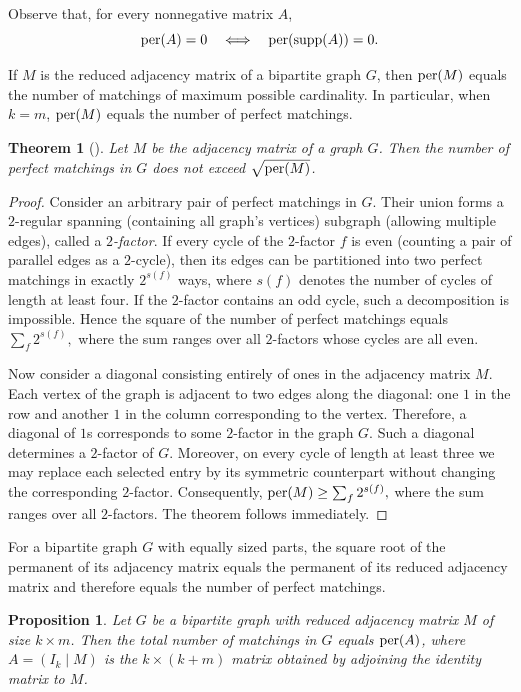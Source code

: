 \documentclass[11pt]{article}
\newtheorem{theorem}{Theorem}[section]
\newtheorem{claim}{Proposition}[section]
\theoremstyle{definition}
\newcommand{\supp}{{\rm supp}}
\newcommand{\per}{{\rm per}}
\begin{document}
{{{Observe that, for every nonnegative matrix $A$,
\[
\per(A)=0
\quad\Longleftrightarrow\quad
\per(\supp(A))=0.
\]

If $M$ is the reduced adjacency matrix of a bipartite graph $G$, then
$\per(M)$ equals the number of matchings of maximum possible
cardinality.
In particular, when $k=m$, $\per(M)$ equals the number of perfect
matchings.

\begin{theorem}[\cite{AlonF}]
Let $M$ be the adjacency matrix of a graph $G$.
Then the number of perfect matchings in $G$ does not exceed
$\sqrt{\per(M)}$.
\end{theorem}

\begin{proof}
Consider an arbitrary pair of perfect matchings in $G$.
Their union forms a $2$-regular spanning (containing all graph's vertices) subgraph (allowing multiple
edges), called a {\sl $2$-factor}.
If every cycle of the $2$-factor $f$ is even (counting a pair of parallel
edges as a $2$-cycle), then its edges can be partitioned into two
perfect matchings in exactly $2^{s(f)}$ ways, where $s(f)$ denotes the
number of cycles of length at least four.
If the $2$-factor contains an odd cycle, such a decomposition is
impossible.
Hence the square of the number of perfect matchings equals
$
\sum_f2^{s(f)},
$
where the sum ranges over all $2$-factors whose cycles are all even.

Now consider a diagonal consisting entirely of ones in the adjacency
matrix $M$. Each vertex of the graph is adjacent to two edges along the diagonal:
one $1$ in the row and another $1$ in the column corresponding to the
vertex. Therefore, a diagonal of $1$s corresponds to some
$2$-factor in the graph $G$. 
Such a diagonal determines a  $2$-factor of $G$.
Moreover, on every cycle of length at least three we may replace each
selected entry by its symmetric counterpart without changing the
corresponding $2$-factor.
Consequently,
$
\per(M)\ge
\sum_f2^{s(f)},
$
where the sum ranges over all $2$-factors.
The theorem follows immediately.
\end{proof}

For a bipartite graph $G$ with equally sized parts, the square root of
the permanent of its adjacency matrix equals the permanent of its
reduced adjacency matrix and therefore equals the number of perfect
matchings.

\begin{claim}
Let $G$ be a bipartite graph with reduced adjacency matrix $M$ of size
$k\times m$.
Then the total number of matchings in $G$ equals
$\per(A)$,
where
$A=(I_k\mid M)$
is the $k\times(k+m)$ matrix obtained by adjoining the identity matrix
to $M$.
\end{claim}

}}}
\end{document}
